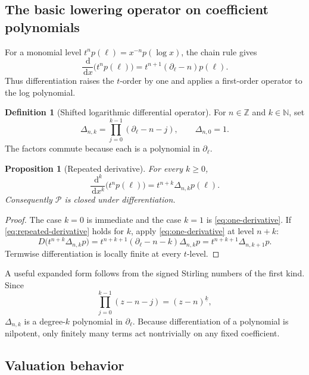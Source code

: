 \documentclass[11pt,oneside]{article}
\numberwithin{equation}{section}
\newtheorem{proposition}[theorem]{Proposition}
\theoremstyle{definition}
\newtheorem{definition}[theorem]{Definition}
\newcommand{\Z}{\mathbb Z}
\newcommand{\N}{\mathbb N}
\newcommand{\PL}{\mathscr P}
\newcommand{\dlog}{\partial_{\ell}}
\newcommand{\dd}{\,\mathrm d}
\begin{document}
\subsection{The basic lowering operator on coefficient polynomials}

For a monomial level \(t^n p(\ell)=x^{-n}p(\log x)\), the chain rule gives
\begin{equation}\label{eq:one-derivative}
  \frac{\dd}{\dd x}\bigl(t^n p(\ell)\bigr)
  =t^{n+1}(\dlog-n)p(\ell).
\end{equation}
Thus differentiation raises the \(t\)-order by one and applies a first-order
operator to the log polynomial.

\begin{definition}[Shifted logarithmic differential operator]
For \(n\in\Z\) and \(k\in\N\), set
\begin{equation}\label{eq:Delta-def}
  \Delta_{n,k}
  =\prod_{j=0}^{k-1}(\dlog-n-j),
  \qquad \Delta_{n,0}=1.
\end{equation}
The factors commute because each is a polynomial in \(\dlog\).
\end{definition}

\begin{proposition}[Repeated derivative]\label{prop:repeated-derivative}
For every \(k\ge0\),
\begin{equation}\label{eq:repeated-derivative}
  \frac{\dd^k}{\dd x^k}\bigl(t^n p(\ell)\bigr)
  =t^{n+k}\Delta_{n,k}p(\ell).
\end{equation}
Consequently \(\PL\) is closed under differentiation.
\end{proposition}

\begin{proof}
The case \(k=0\) is immediate and the case \(k=1\) is
\eqref{eq:one-derivative}.  If \eqref{eq:repeated-derivative} holds for \(k\),
apply \eqref{eq:one-derivative} at level \(n+k\):
\[
 D\bigl(t^{n+k}\Delta_{n,k}p\bigr)
 =t^{n+k+1}(\dlog-n-k)\Delta_{n,k}p
 =t^{n+k+1}\Delta_{n,k+1}p.
\]
Termwise differentiation is locally finite at every \(t\)-level.
\end{proof}

A useful expanded form follows from the signed Stirling numbers of the first
kind.  Since
\[
  \prod_{j=0}^{k-1}(z-n-j)=(z-n)^{\underline{k}},
\]
\(\Delta_{n,k}\) is a degree-\(k\) polynomial in \(\dlog\).  Because differentiation
of a polynomial is nilpotent, only finitely many terms act nontrivially on any
fixed coefficient.

\subsection{Valuation behavior}
\end{document}
